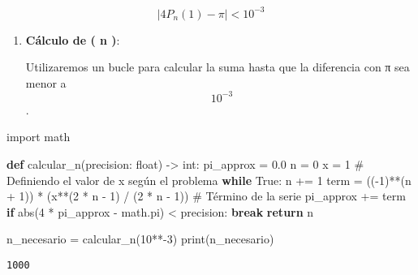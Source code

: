 \documentclass[
  letterpaper,
  DIV=11,
  numbers=noendperiod]{scrartcl}
\newenvironment{Shaded}{\begin{snugshade}}{\end{snugshade}}
\newcommand{\BuiltInTok}[1]{\textcolor[rgb]{0.00,0.23,0.31}{#1}}
\newcommand{\CommentTok}[1]{\textcolor[rgb]{0.37,0.37,0.37}{#1}}
\newcommand{\ControlFlowTok}[1]{\textcolor[rgb]{0.00,0.23,0.31}{\textbf{#1}}}
\newcommand{\DecValTok}[1]{\textcolor[rgb]{0.68,0.00,0.00}{#1}}
\newcommand{\FloatTok}[1]{\textcolor[rgb]{0.68,0.00,0.00}{#1}}
\newcommand{\ImportTok}[1]{\textcolor[rgb]{0.00,0.46,0.62}{#1}}
\newcommand{\KeywordTok}[1]{\textcolor[rgb]{0.00,0.23,0.31}{\textbf{#1}}}
\newcommand{\NormalTok}[1]{\textcolor[rgb]{0.00,0.23,0.31}{#1}}
\newcommand{\OperatorTok}[1]{\textcolor[rgb]{0.37,0.37,0.37}{#1}}
\newcommand{\VariableTok}[1]{\textcolor[rgb]{0.07,0.07,0.07}{#1}}
\begin{document}
\[
   \left| 4 P_n(1) - \pi \right| < 10^{-3}
\]

\begin{enumerate}
\def\labelenumi{\arabic{enumi}.}
\setcounter{enumi}{4}
\item
  \textbf{Cálculo de ( n )}:

  Utilizaremos un bucle para calcular la suma hasta que la diferencia
  con π sea menor a \[\ 10^{-3} \].
\end{enumerate}

\begin{Shaded}
\begin{Highlighting}[]

\ImportTok{import}\NormalTok{ math}

\KeywordTok{def}\NormalTok{ calcular\_n(precision: }\BuiltInTok{float}\NormalTok{) }\OperatorTok{{-}\textgreater{}} \BuiltInTok{int}\NormalTok{:}
\NormalTok{    pi\_approx }\OperatorTok{=} \FloatTok{0.0}
\NormalTok{    n }\OperatorTok{=} \DecValTok{0}
\NormalTok{    x }\OperatorTok{=} \DecValTok{1}  \CommentTok{\# Definiendo el valor de x según el problema}
    \ControlFlowTok{while} \VariableTok{True}\NormalTok{:}
\NormalTok{        n }\OperatorTok{+=} \DecValTok{1}
\NormalTok{        term }\OperatorTok{=}\NormalTok{ ((}\OperatorTok{{-}}\DecValTok{1}\NormalTok{)}\OperatorTok{**}\NormalTok{(n }\OperatorTok{+} \DecValTok{1}\NormalTok{)) }\OperatorTok{*}\NormalTok{ (x}\OperatorTok{**}\NormalTok{(}\DecValTok{2} \OperatorTok{*}\NormalTok{ n }\OperatorTok{{-}} \DecValTok{1}\NormalTok{) }\OperatorTok{/}\NormalTok{ (}\DecValTok{2} \OperatorTok{*}\NormalTok{ n }\OperatorTok{{-}} \DecValTok{1}\NormalTok{))  }\CommentTok{\# Término de la serie}
\NormalTok{        pi\_approx }\OperatorTok{+=}\NormalTok{ term}
        \ControlFlowTok{if} \BuiltInTok{abs}\NormalTok{(}\DecValTok{4} \OperatorTok{*}\NormalTok{ pi\_approx }\OperatorTok{{-}}\NormalTok{ math.pi) }\OperatorTok{\textless{}}\NormalTok{ precision:}
            \ControlFlowTok{break}
    \ControlFlowTok{return}\NormalTok{ n}

\NormalTok{n\_necesario }\OperatorTok{=}\NormalTok{ calcular\_n(}\DecValTok{10}\OperatorTok{**{-}}\DecValTok{3}\NormalTok{)}
\BuiltInTok{print}\NormalTok{(n\_necesario)}




\end{Highlighting}
\end{Shaded}

\begin{verbatim}
1000
\end{verbatim}
\end{document}
